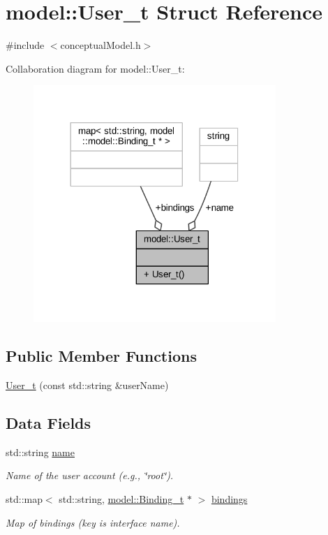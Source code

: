 \hypertarget{structmodel_1_1_user__t}{}\section{model\+:\+:User\+\_\+t Struct Reference}
\label{structmodel_1_1_user__t}


{\ttfamily \#include $<$conceptual\+Model.\+h$>$}



Collaboration diagram for model\+:\+:User\+\_\+t\+:
\nopagebreak
\begin{figure}[H]
\begin{center}
\leavevmode
\includegraphics[width=260pt]{structmodel_1_1_user__t__coll__graph}
\end{center}
\end{figure}
\subsection*{Public Member Functions}
\begin{DoxyCompactItemize}
\item 
\hyperlink{structmodel_1_1_user__t_aec27f4ba623bcda2390a6a72aad802ac}{User\+\_\+t} (const std\+::string \&user\+Name)
\end{DoxyCompactItemize}
\subsection*{Data Fields}
\begin{DoxyCompactItemize}
\item 
std\+::string \hyperlink{structmodel_1_1_user__t_a3c1b1639e7f20439d38957e7c7f89df1}{name}
\begin{DoxyCompactList}\small\item\em Name of the user account (e.\+g., \char`\"{}root\char`\"{}). \end{DoxyCompactList}\item 
std\+::map$<$ std\+::string, \hyperlink{structmodel_1_1_binding__t}{model\+::\+Binding\+\_\+t} $\ast$ $>$ \hyperlink{structmodel_1_1_user__t_a99733f23142024955d59efaca25c2fbc}{bindings}
\begin{DoxyCompactList}\small\item\em Map of bindings (key is interface name). \end{DoxyCompactList}\end{DoxyCompactItemize}


